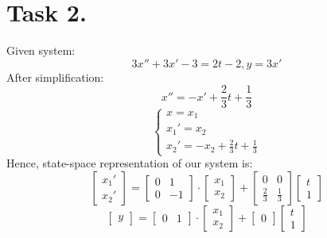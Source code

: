 \documentclass[a4paper,12pt]{article}
\begin{document}
\section{Task 2.}
Given system:
$$3x''+3x'-3=2t-2, y=3x'$$
After simplification:
$$x''=-x'+\frac{2}{3}t+\frac{1}{3}$$
$$\begin{cases}
    x=x_1\\
    x_1'=x_2\\
    x_2'=-x_2+\frac{2}{3}t+\frac{1}{3}
\end{cases}$$
Hence, state-space representation of our system is:
\begin{equation*}
    \begin{bmatrix}
        x_1'\\x_2'
    \end{bmatrix}
    =
    \begin{bmatrix}
        0 & 1\\
        0 & -1
    \end{bmatrix}
    \cdot
    \begin{bmatrix}
        x_1 \\ x_2
    \end{bmatrix}
    +
    \begin{bmatrix}
        0 & 0 \\
        \frac{2}{3} & \frac{1}{3}
    \end{bmatrix}
    \begin{bmatrix}
        t \\ 1
    \end{bmatrix}
\end{equation*}
\begin{equation*}
    \begin{bmatrix}
        y
    \end{bmatrix}
    =
    \begin{bmatrix}
        0 & 1
    \end{bmatrix}
    \cdot
    \begin{bmatrix}
        x_1 \\ x_2
    \end{bmatrix}
    +
    \begin{bmatrix}
        0
    \end{bmatrix}
    \begin{bmatrix}
        t \\ 1
    \end{bmatrix}
\end{equation*}
\end{document}
